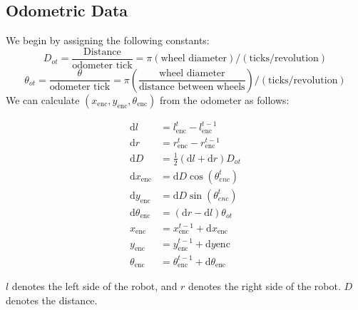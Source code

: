\documentclass{article}
\begin{document}
\subsection{Odometric Data}
We begin by assigning the following constants: 
\[D_{ot}=\frac{\text{Distance}}{\text{odometer tick}}=\pi(\text{wheel diameter})/(\text{ticks/revolution})\]\[ \theta_{ot} = \frac{\theta}{\text{odometer tick}} = \pi\left(\frac{\text{wheel diameter}}{\text{distance between wheels}}\right)/(\text{ticks/revolution})\]
We can calculate $(x_{\mathrm{enc}}, y_{\mathrm{enc}}, \theta_{\mathrm{enc}})$ from the odometer as follows: 
\begin{center}
	\begin{align}
		\mathrm{d}l &= l^t_{\mathrm{enc}}-l^{t-1}_{\mathrm{enc}} \\
		\mathrm{d}r &= r^t_{\mathrm{enc}}-r^{t-1}_{\mathrm{enc}} \\
		\mathrm{d}D &= \frac{1}{2}(\mathrm{d}l+\mathrm{d}r)D_{ot} \\
		\mathrm{d}x_{\mathrm{enc}} &= \mathrm{d}D\cos(\theta^t_{enc}) \\
		\mathrm{d}y_{\mathrm{enc}} &= \mathrm{d}D\sin(\theta^t_{enc}) \\
		\mathrm{d}\theta_{\mathrm{enc}} &= (\mathrm{d}r-\mathrm{d}l)\theta_{ot} \\
		x_{\mathrm{enc}} &= x^{t-1}_{\mathrm{enc}} + \mathrm{d}x_{\mathrm{enc}} \\
		y_{\mathrm{enc}} &= y^{t-1}_{\mathrm{enc}} + \mathrm{d}y{\mathrm{enc}} \\
		\theta_{\mathrm{enc}} &= \theta^{t-1}_{\mathrm{enc}} + \mathrm{d}\theta_{\mathrm{enc}}
	\end{align}
\end{center}

$l$ denotes the left side of the robot, and $r$ denotes the right side of the robot. $D$ denotes the distance. 
\end{document}
